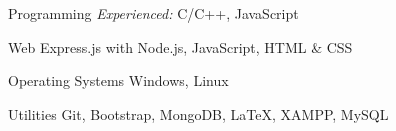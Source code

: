 

\begin{cvskills}

  \cvskill
    {Programming} %
    {\iffalse{\em Proficient:}\hspace{0.5em}\fi {\em Experienced:} C/C++, JavaScript } %

  \cvskill
    {Web} %
    {Express.js with Node.js, JavaScript, HTML \& CSS} %

  \cvskill
    {Operating Systems} %
    {Windows, Linux} %

  \cvskill
    {Utilities} %
    {Git, Bootstrap, MongoDB, \LaTeX, XAMPP, MySQL} %
    
\end{cvskills}
